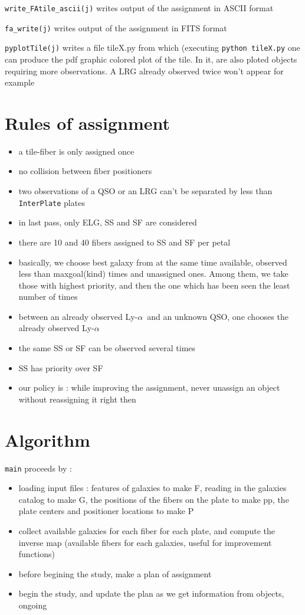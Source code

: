 \documentclass{article}
\def\lya{Ly-$\alpha$\ }
\begin{document}
{\tt write\_FAtile\_ascii(j)} writes output of the assignment in ASCII format

{\tt fa\_write(j)} writes output of the assignment in FITS format

{\tt pyplotTile(j)} writes a file tileX.py from which (executing {\tt python tileX.py} one can produce the pdf graphic colored plot of the tile. In it, are also ploted objects requiring more observations. A LRG already observed twice won't appear for example

\section{Rules of assignment}
\begin{itemize}
	\item a tile-fiber is only assigned once
	\item no collision between fiber positioners
	\item two observations of a QSO or an LRG can't be separated by less than {\tt InterPlate} plates
	\item in last pass, only ELG, SS and SF are considered
	\item there are 10 and 40 fibers assigned to SS and SF per petal
	\item basically, we choose best galaxy from at the same time available, observed less than maxgoal(kind) times and unassigned ones. Among them, we take those with highest priority, and then the one which has been seen the least number of times
	\item between an already observed \lya and an unknown QSO, one chooses the already observed \lya
	\item the same SS or SF can be observed several times
	\item SS has priority over SF
	\item our policy is : while improving the assignment, never unassign an object without reassigning it right then
\end{itemize}

\section{Algorithm}
 {\tt main} proceeds by : 
 
 \begin{itemize}
	 \item loading input files : features of galaxies to make F, reading in the galaxies catalog to make G, the positions of the fibers on the plate to make pp, the plate centers and positioner locations to make P
	 \item collect available galaxies for each fiber for each plate, and compute the inverse map (available fibers for each galaxies, useful for improvement functions)
	 \item before begining the study, make a plan of assignment
	 \item begin the study, and update the plan as we get information from objects, ongoing
 \end{itemize}
\end{document}
